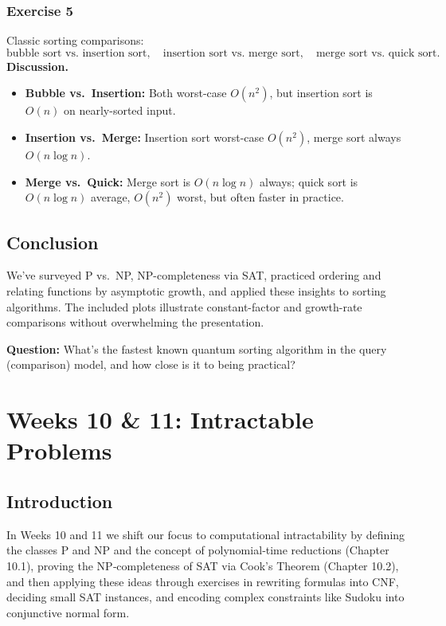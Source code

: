 \documentclass{article}
\theoremstyle{theorem}
\theoremstyle{definition}
\theoremstyle{remark}
\begin{document}
\subsubsection*{Exercise 5}
Classic sorting comparisons:
\[
\text{bubble sort vs.\ insertion sort},\quad
\text{insertion sort vs.\ merge sort},\quad
\text{merge sort vs.\ quick sort}.
\]
\textbf{Discussion.}
\begin{itemize}
  \item \textbf{Bubble vs.\ Insertion:} Both worst-case \(O(n^2)\), but insertion sort is \(O(n)\) on nearly-sorted input.
  \item \textbf{Insertion vs.\ Merge:} Insertion sort worst-case \(O(n^2)\), merge sort always \(O(n\log n)\).
  \item \textbf{Merge vs.\ Quick:} Merge sort is \(O(n\log n)\) always; quick sort is \(O(n\log n)\) average, \(O(n^2)\) worst, but often faster in practice.
\end{itemize}

\subsection{Conclusion}
We’ve surveyed P vs.\ NP, NP-completeness via SAT, practiced ordering and relating functions by asymptotic growth, and applied these insights to sorting algorithms. The included plots illustrate constant-factor and growth-rate comparisons without overwhelming the presentation.

\textbf{Question:} What’s the fastest known quantum sorting algorithm in the query (comparison) model, and how close is it to being practical?

\section{Weeks 10 \& 11: Intractable Problems}

\subsection{Introduction}
In Weeks 10 and 11 we shift our focus to computational intractability by defining the classes P and NP and the concept of polynomial‐time reductions (Chapter 10.1), proving the NP‐completeness of SAT via Cook’s Theorem (Chapter 10.2), and then applying these ideas through exercises in rewriting formulas into CNF, deciding small SAT instances, and encoding complex constraints like Sudoku into conjunctive normal form.
\end{document}
